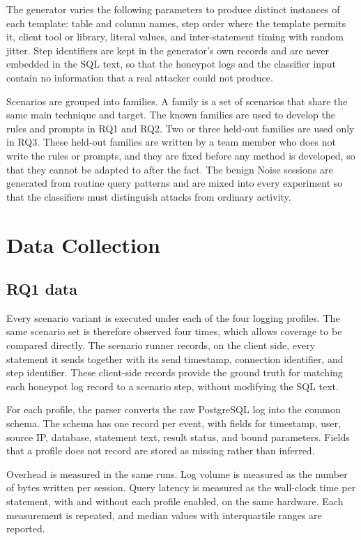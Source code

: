 \documentclass[12pt,a4paper]{report}
\begin{document}
The generator varies the following parameters to produce distinct instances of each template: table and column names, step order where the template permits it, client tool or library, literal values, and inter-statement timing with random jitter. Step identifiers are kept in the generator's own records and are never embedded in the SQL text, so that the honeypot logs and the classifier input contain no information that a real attacker could not produce.

Scenarios are grouped into families. A family is a set of scenarios that share the same main technique and target. The known families are used to develop the rules and prompts in RQ1 and RQ2. Two or three held-out families are used only in RQ3. These held-out families are written by a team member who does not write the rules or prompts, and they are fixed before any method is developed, so that they cannot be adapted to after the fact. The benign Noise sessions are generated from routine query patterns and are mixed into every experiment so that the classifiers must distinguish attacks from ordinary activity.

\section{Data Collection}
\subsection{RQ1 data}
Every scenario variant is executed under each of the four logging profiles. The same scenario set is therefore observed four times, which allows coverage to be compared directly. The scenario runner records, on the client side, every statement it sends together with its send timestamp, connection identifier, and step identifier. These client-side records provide the ground truth for matching each honeypot log record to a scenario step, without modifying the SQL text.

For each profile, the parser converts the raw PostgreSQL log into the common schema. The schema has one record per event, with fields for timestamp, user, source IP, database, statement text, result status, and bound parameters. Fields that a profile does not record are stored as missing rather than inferred.

Overhead is measured in the same runs. Log volume is measured as the number of bytes written per session. Query latency is measured as the wall-clock time per statement, with and without each profile enabled, on the same hardware. Each measurement is repeated, and median values with interquartile ranges are reported.
\end{document}

